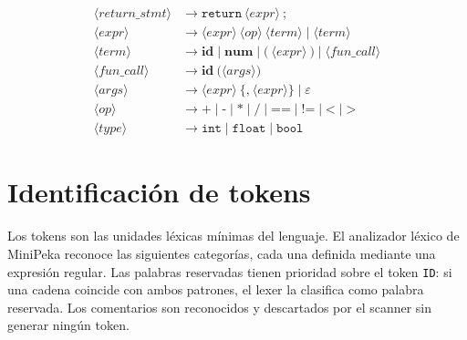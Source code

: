 \documentclass[12pt]{article}
\begin{document}
\begin{align*}
\langle return\_stmt \rangle &\to \texttt{return}\ \langle expr \rangle
                                   \ \texttt{;} \\[4pt]
\langle expr \rangle         &\to \langle expr \rangle\ \langle op \rangle
                                   \ \langle term \rangle
                                   \mid \langle term \rangle \\[4pt]
\langle term \rangle         &\to \textbf{id}
                                   \mid \textbf{num}
                                   \mid \texttt{(}\ \langle expr \rangle
                                   \ \texttt{)}
                                   \mid \langle fun\_call \rangle \\[4pt]
\langle fun\_call \rangle    &\to \textbf{id}\ \texttt{(}
                                   \langle args \rangle \texttt{)} \\[4pt]
\langle args \rangle         &\to \langle expr \rangle
                                   \ \{ \texttt{,}\ \langle expr \rangle \}
                                   \mid \varepsilon \\[4pt]
\langle op \rangle           &\to \texttt{+} \mid \texttt{-}
                                   \mid \texttt{*} \mid \texttt{/}
                                   \mid \texttt{==} \mid \texttt{!=}
                                   \mid \texttt{<} \mid \texttt{>} \\[4pt]
\langle type \rangle         &\to \texttt{int} \mid \texttt{float}
                                   \mid \texttt{bool}
\end{align*}
\shorthandon{<>}

\section{Identificación de tokens}

Los tokens son las unidades léxicas mínimas del lenguaje. El analizador
léxico de MiniPeka reconoce las siguientes categorías, cada una definida
mediante una expresión regular. Las palabras reservadas tienen prioridad
sobre el token \texttt{ID}: si una cadena coincide con ambos patrones,
el lexer la clasifica como palabra reservada. Los comentarios son
reconocidos y descartados por el scanner sin generar ningún token.
\end{document}
